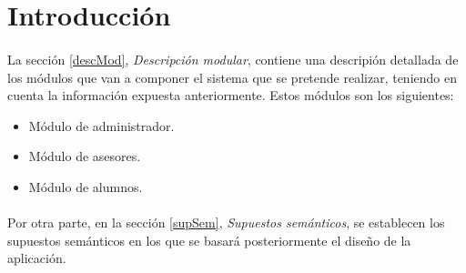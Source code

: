 \section{Introducción}

\paragraph{}La sección \ref{descMod}, \textit{Descripción modular}, contiene
una descripión detallada de los módulos que van a componer el sistema que se
pretende realizar, teniendo en cuenta la información expuesta anteriormente.
Estos módulos son los siguientes:
\begin{itemize}
   \item Módulo de administrador.
   \item Módulo de asesores.
   \item Módulo de alumnos.
\end{itemize}

\paragraph{}Por otra parte, en la sección \ref{supSem}, 
\textit{Supuestos semánticos}, se establecen los supuestos semánticos en los
que se basará posteriormente el diseño de la aplicación.
